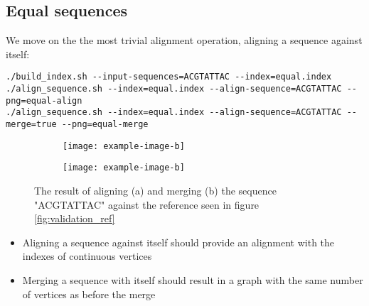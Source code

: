\documentclass[thesis.tex]{subfiles}
\begin{document}
\subsection*{Equal sequences}
We move on the the most trivial alignment operation, aligning a sequence against itself:\\
\par\noindent
 \texttt{./build\_index.sh -{}-input-sequences=ACGTATTAC -{}-index=equal.index}\\
 \texttt{./align\_sequence.sh -{}-index=equal.index -{}-align-sequence=ACGTATTAC -{}-png=equal-align}\\
 \texttt{./align\_sequence.sh -{}-index=equal.index -{}-align-sequence=ACGTATTAC -{}-merge=true -{}-png=equal-merge}\\
 \begin{figure}[!h]
  \begin{subfigure}[t]{\textwidth}
    \texttt{[image: example-image-b]}
    \subcaption{}
  \end{subfigure}
  \begin{subfigure}[t]{\textwidth}
    \texttt{[image: example-image-b]}
    \subcaption{}
  \end{subfigure} 
  \caption{The result of aligning (a) and merging (b) the sequence "ACGTATTAC" against the reference seen in figure \ref{fig:validation_ref}}
  \label{fig:validation_equal}
\end{figure}
\begin{itemize}
  \item Aligning a sequence against itself should provide an alignment with the indexes of continuous vertices
  \item Merging a sequence with itself should result in a graph with the same number of vertices as before the merge
\end{itemize}
\end{document}
